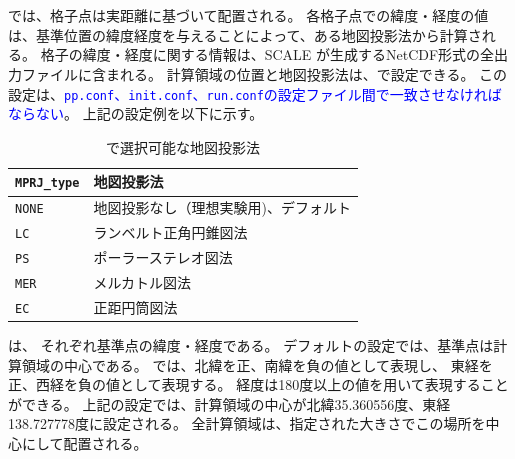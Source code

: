 \section{\SecMapprojectionSetting} \label{subsec:adv_mapproj}
\scalerm では、格子点は実距離に基づいて配置される。
各格子点での緯度・経度の値は、基準位置の緯度経度を与えることによって、ある地図投影法から計算される。
格子の緯度・経度に関する情報は、SCALE が生成するNetCDF形式の全出力ファイルに含まれる。
計算領域の位置と地図投影法は、で設定できる。
この設定は、\textcolor{blue}{\texttt{pp.conf}、\texttt{init.conf}、\texttt{run.conf}の設定ファイル間で一致させなければならない}。
上記の設定例を以下に示す。\\

\begin{table}[b]
\begin{center}
\caption{\scalerm で選択可能な地図投影法}
\begin{tabularx}{150mm}{|l|X|} \hline
 \rowcolor[gray]{0.9} \verb|MPRJ_type| & 地図投影法 \\ \hline
 \verb|NONE| & 地図投影なし（理想実験用)、デフォルト \\ \hline
 \verb|LC|   & ランベルト正角円錐図法              \\ \hline
 \verb|PS|   & ポーラーステレオ図法                \\ \hline
 \verb|MER|  & メルカトル図法                     \\ \hline
 \verb|EC|   & 正距円筒図法                       \\ \hline
\end{tabularx}
\label{tab:map_proj}
\end{center}
\end{table}

\noindent
{}は、
それぞれ基準点の緯度・経度である。
デフォルトの設定では、基準点は計算領域の中心である。
\scalerm では、北緯を正、南緯を負の値として表現し、
東経を正、西経を負の値として表現する。
経度は180度以上の値を用いて表現することができる。
上記の設定では、計算領域の中心が北緯35.360556度、東経138.727778度に設定される。
全計算領域は、指定された大きさでこの場所を中心にして配置される。

